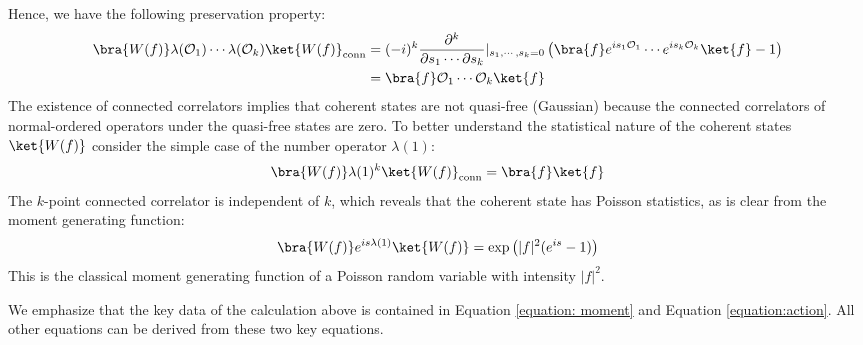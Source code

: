 \documentclass[a4paper,11pt]{article}
\theoremstyle{definition}
\numberwithin{equation}{section}
\newcommand{\lb}{\left(}
\newcommand{\rb}{\right)}
\begin{document}
Hence, we have the following preservation property:
\begin{align}
    \begin{split}
        \bra{W(f)}\lambda(\mathcal{O}_1)\cdots\lambda(\mathcal{O}_k)\ket{W(f)}_\text{conn} &= (-i)^k\frac{\partial^k}{\partial s_1\cdots\partial s_k}|_{s_1,\cdots,s_k = 0}\lb\bra{f}e^{is_1\mathcal{O}_1}\cdots e^{is_k\mathcal{O}_k}\ket{f} -  1\rb \\&= \bra{f}\mathcal{O}_1\cdots\mathcal{O}_k\ket{f}    
    \end{split} 
\end{align}
The existence of connected correlators implies that coherent states are not quasi-free (Gaussian) because the connected correlators of normal-ordered operators under the quasi-free states are zero. To better understand the statistical nature of the coherent states $\ket{W(f)}$ consider the simple case of the number operator $\lambda(1)$:
\begin{eqnarray}
    \bra{W(f)}\lambda(1)^k\ket{W(f)}_\text{conn} = \bra{f}\ket{f}
\end{eqnarray}
The $k$-point connected correlator is independent of $k$, which reveals that the coherent state has Poisson statistics, as is clear from the moment generating function:
\begin{eqnarray}
    \bra{W(f)}e^{is\lambda(1)}\ket{W(f)} = \exp\lb|f|^2(e^{is} - 1)\rb
\end{eqnarray}
This is the classical moment generating function of a Poisson random variable with intensity $|f|^2$.

We emphasize that the key data of the calculation above is contained in Equation \ref{equation: moment} and Equation \ref{equation:action}. All other equations can be derived from these two key equations.
\end{document}
